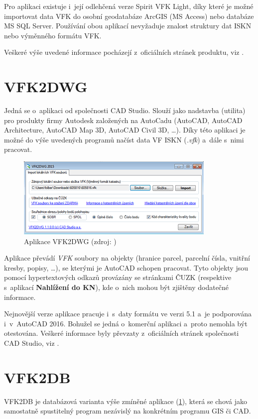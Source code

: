 \documentclass[a4paper,12pt,oneside]{book}
\begin{document}
Pro aplikaci existuje i~její odlehčená verze Spirit VFK Light, díky
které je možné importovat data VFK do osobní geodatabáze ArcGIS (MS
Access) nebo databáze MS SQL Server. Používání obou aplikací
nevyžaduje znalost struktury dat ISKN nebo výměnného formátu VFK.

Veškeré výše uvedené informace pocházejí z~oficiálních stránek
produktu, viz \cite{spirit_vfk}.

\section{VFK2DWG}
\label{l_vfk2dwg}
Jedná se o~aplikaci od společnosti CAD Studio. Slouží jako nadstavba
(utilita) pro produkty firmy Autodesk založených na AutoCadu (AutoCAD,
AutoCAD Architecture, AutoCAD Map 3D, AutoCAD Civil 3D, \dots). Díky
této aplikaci je možné do výše uvedených programů načíst data VF ISKN
(\textit{.vfk}) a~dále s~nimi pracovat.

\begin{figure}[htb]
\centering
\includegraphics[scale=0.85]{images/vfk2dwg-aplikace.png}
\caption[Aplikace VFK2DWG]{Aplikace VFK2DWG (zdroj: \cite{cadstudio-vfk2dwg})}
\end{figure}

Aplikace převádí \textit{VFK} soubory na objekty (hranice parcel,
parcelní čísla, vnitřní kresby, popisy, \dots), se kterými je AutoCAD
schopen pracovat. Tyto objekty jsou pomocí hypertextových odkazů
provázány se stránkami ČUZK (respektive s~aplikací \textbf{Nahlížení
 do KN}), kde o~nich mohou být zjištěny dodatečné informace.

Nejnovější verze aplikace pracuje i~s~daty formátu ve verzi 5.1 a~je
podporována i~v~AutoCAD 2016. Bohužel se jedná o~komerční aplikaci
a~proto nemohla být otestována. Veškeré informace byly převzaty
z~oficiálních stránek společnosti CAD Studio, viz
\cite{cadstudio-vfk2dwg}.


\section{VFK2DB}
VFK2DB je databázová varianta výše zmíněné aplikace (\ref{l_vfk2dwg}),
která se chová jako samostatně spustitelný program nezávislý na
konkrétním programu GIS či CAD.
\end{document}
